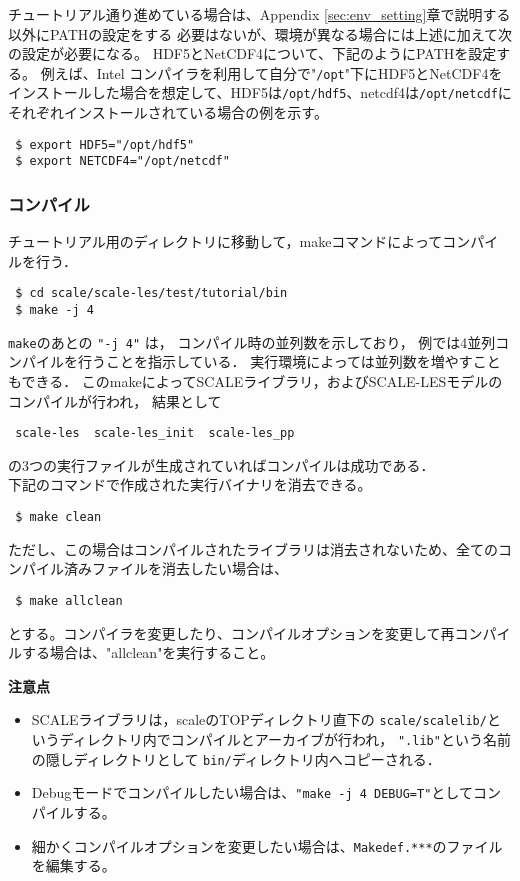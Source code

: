 チュートリアル通り進めている場合は、Appendix \ref{sec:env_setting}章で説明する以外にPATHの設定をする
必要はないが、環境が異なる場合には上述に加えて次の設定が必要になる。
HDF5とNetCDF4について、下記のようにPATHを設定する。
例えば、Intel コンパイラを利用して自分で"\verb|/opt|"下にHDF5とNetCDF4を
インストールした場合を想定して、HDF5は\verb"/opt/hdf5"、netcdf4は\verb|/opt/netcdf|に
それぞれインストールされている場合の例を示す。
\begin{verbatim}
 $ export HDF5="/opt/hdf5"
 $ export NETCDF4="/opt/netcdf"
\end{verbatim}


\subsubsection{コンパイル}

チュートリアル用のディレクトリに移動して，makeコマンドによってコンパイルを行う．
\begin{verbatim}
 $ cd scale/scale-les/test/tutorial/bin
 $ make -j 4
\end{verbatim}
\verb|make|のあとの \verb|"-j 4"| は，
コンパイル時の並列数を示しており，
例では4並列コンパイルを行うことを指示している．
実行環境によっては並列数を増やすこともできる．
このmakeによってSCALEライブラリ，およびSCALE-LESモデルのコンパイルが行われ，
結果として
\begin{verbatim}
 scale-les  scale-les_init  scale-les_pp
\end{verbatim}
の3つの実行ファイルが生成されていればコンパイルは成功である．\\

下記のコマンドで作成された実行バイナリを消去できる。
\begin{verbatim}
 $ make clean
\end{verbatim}
ただし、この場合はコンパイルされたライブラリは消去されないため、全てのコンパイル済みファイルを消去したい場合は、
\begin{verbatim}
 $ make allclean
\end{verbatim}
とする。コンパイラを変更したり、コンパイルオプションを変更して再コンパイルする場合は、"allclean"を実行すること。


{\bf 注意点}
\begin{itemize}
\item SCALEライブラリは，scaleのTOPディレクトリ直下の
 \verb|scale/scalelib/|というディレクトリ内でコンパイルとアーカイブが行われ，
 \verb|".lib"|という名前の隠しディレクトリとして
 \verb|bin/|ディレクトリ内へコピーされる．
\item Debugモードでコンパイルしたい場合は、\verb|"make -j 4 DEBUG=T"|としてコンパイルする。
\item 細かくコンパイルオプションを変更したい場合は、\verb|Makedef.***|のファイルを編集する。
\end{itemize}


